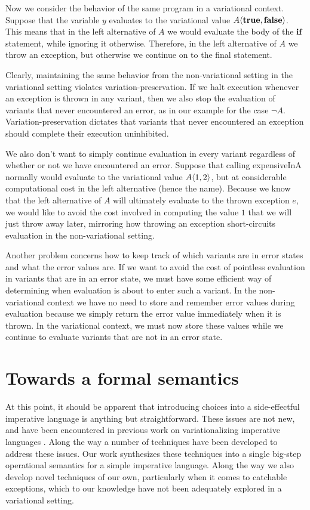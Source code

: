 \documentclass[12pt,oneside]{book}
\begin{document}
Now we consider the behavior of the same program in a variational context.
Suppose that the variable $y$ evaluates to the variational value
$A \langle \textbf{\textup{\textrm{true}}}, \textbf{\textup{\textrm{false}}} \rangle$. This means that in the left alternative of $A$ we
would evaluate the body of the $\textbf{\textup{\textrm{if}}}$ statement, while ignoring it otherwise. Therefore,
in the left alternative of $A$ we throw an exception, but otherwise we continue on to the
final statement.

Clearly, maintaining the same behavior from the non-variational setting in the variational setting
violates variation-preservation. If we halt execution whenever an exception is
thrown in any variant, then we also stop the evaluation of variants that never encountered an error,
as in our example for the case $\neg A$. Variation-preservation dictates that variants that never encountered
an exception should complete their execution uninhibited.

We also don't want to simply continue evaluation
in every variant regardless of whether or not we have encountered an error.
Suppose that calling expensiveInA normally would evaluate to the variational value $A \langle 1, 2 \rangle$, but at considerable computational cost in the left alternative (hence the name).
Because we know that the left alternative of $A$ will ultimately evaluate to the thrown exception $e$, we would
like to avoid the cost involved in computing the value $1$ that we will just throw away later, mirroring how throwing an exception short-circuits evaluation in the
non-variational setting. 

Another problem concerns how to keep track of which variants are in error states and what
the error values are. If we want to avoid the cost of pointless evaluation in variants that are in an error
state, we must have some efficient way of determining when evaluation is about to enter such a variant.
In the non-variational context we have no need to store and remember error values during evaluation
because we simply return the error value immediately when it is thrown. In the variational context, we
must now store these values while we continue to evaluate variants that are not in an error state.

\section{Towards a formal semantics}

At this point, it should be apparent that introducing choices into a side-effectful imperative language
is anything but straightforward. These issues are not new, and have been encountered in previous
work on variationalizing imperative languages \cite{varwhile,varex,varexj}. Along the way a number of
techniques have been developed to address these issues. Our work synthesizes these techniques into
a single big-step operational semantics for a simple imperative language. Along the way we also develop
novel techniques of our own, particularly when it comes to catchable exceptions, which to our knowledge
have not been adequately explored in a variational setting.
\end{document}
